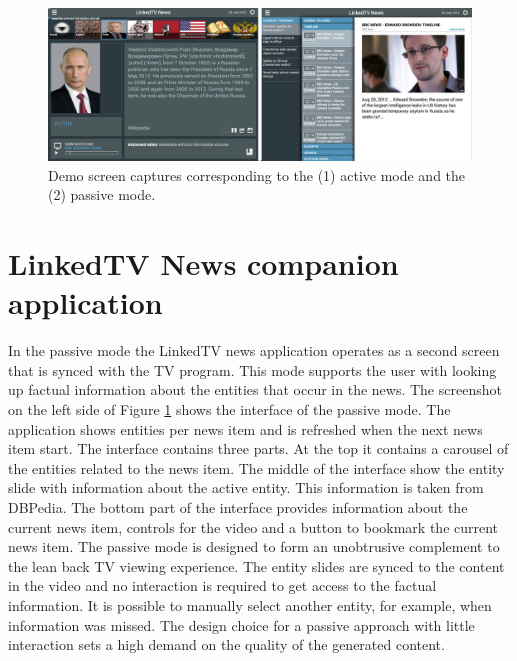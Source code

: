 \documentclass{llncs}
\begin{document}

\begin{figure}[t!]
\centering
\includegraphics[width=1\textwidth]{figure/DemoScreen}
\caption{Demo screen captures corresponding to the (1) active mode and the (2) passive mode.}
\label{fig:interface}%
\end{figure}

\section{LinkedTV News companion application}
\label{sec:tvnews}

In the passive mode the LinkedTV news application operates as a second screen that is synced with the TV program. This mode supports the user with looking up factual information about the entities that occur in the news. The screenshot on the left side of Figure \ref{fig:interface} shows the interface of the passive mode. The application shows entities per news item and is refreshed when the next news item start. The interface contains three parts. At the top it contains a carousel of the entities related to the news item. The middle of the interface show the entity slide with information about the active entity. This information is taken from DBPedia. The bottom part of the interface provides information about the current news item, controls for the video and a button to bookmark the current news item. The passive mode is designed to form an unobtrusive complement to the lean back TV viewing experience. The entity slides are synced to the content in the video and no interaction is required to get access to the factual information. It is possible to manually select another entity, for example, when information was missed. The design choice for a passive approach with little interaction sets a high demand on the quality of the generated content. 
\end{document}
